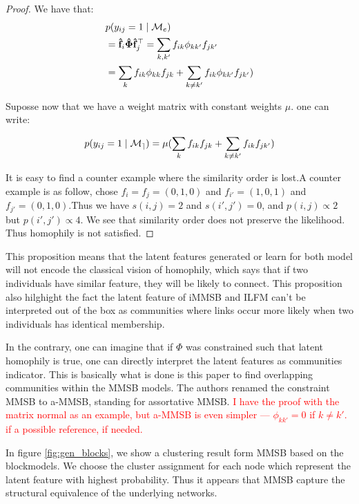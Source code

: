 \begin{proof}
We have that:
\begin{align}
&p(y_{ij}=1 \mid \mathcal{M}_e) \nonumber \\
&=  \mathbf{\hat{f}}_{i} \mathbf{\hat{\Phi}} \mathbf{\hat{f}}_j^\top \nonumber = \sum_{k,k'} f_{ik}\phi_{kk'}f_{jk'}   \nonumber \\
&= \sum_k f_{ik}\phi_{kk}f_{jk} + \sum_{k\neq k'} f_{ik}\phi_{kk'}f_{jk'} ) \nonumber
\end{align}

 Suposse now that we have a weight matrix with constant weights $\mu$. one can write:

\begin{equation}
p(y_{ij}=1 \mid \mathcal{M_e})= \mu (\sum_k f_{ik}f_{jk} + \sum_{k\neq k'} f_{ik}f_{jk'} ) \nonumber
\end{equation}

It is easy to find a counter example where the similarity order is lost.A counter example is as follow, chose $f_i=f_j=(0,1,0)$ and $f_{i'}=(1,0,1)$ and $f_{j'}=(0,1,0)$.Thus we have $s(i,j)=2$ and $s(i',j')=0$, and $p(i,j) \propto 2$ but $p(i',j') \propto 4$. We see that similarity order does not preserve the likelihood. Thus homophily is not satisfied. 
\end{proof} 



This proposition means that the latent features generated or learn for both model will not encode the classical vision of homophily, which says that if two individuals have similar feature, they will be likely to connect. This proposition also hilghight the fact the latent feature of iMMSB and ILFM can't be interpreted out of the box as communities where links occur more likely when two individuals has identical membership.

In the contrary, one can imagine that if $\Phi$ was constrained such that latent homophily is true, one can directly interpret the latent features as communities indicator. This is basically what is done is this paper \cite{AMMSB} to find overlapping communities within the MMSB models. The authors renamed the constraint MMSB to a-MMSB, standing for assortative MMSB. \textcolor{red}{I have the proof with the matrix normal as an example, but a-MMSB is even simpler --- $\phi_{kk'}=0$ if $k\neq k'$. if a possible reference, if needed.}

In figure \ref{fig:gen_blocks}, we show a clustering result form MMSB based on the blockmodels. We choose the cluster assignment for each node which represent the latent feature with highest probability. Thus it appears that MMSB capture the structural equivalence of the underlying networks.

